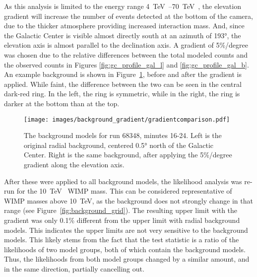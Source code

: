 As this analysis is limited to the energy range \SIrange{4}{70}{\TeV{}}, the elevation gradient will increase the number of events detected at the bottom of the camera, due to the thicker atmosphere providing increased interaction mass.
And, since the Galactic Center is visible almost directly south at an azimuth of \ang{193}, the elevation axis is almost parallel to the declination axis.
A gradient of 5\%/degree was chosen due to the relative differences between the total modeled counts and the observed counts in Figures \ref{fig:gc_profile_gal_l} and \ref{fig:gc_profile_gal_b}.
An example background is shown in Figure~\ref{fig:bkg_flatvsgrad}, before and after the gradient is applied.
While faint, the difference between the two can be seen in the central dark-red ring.
In the left, the ring is symmetric, while in the right, the ring is darker at the bottom than at the top.

\begin{figure}[tb]
  \centering
  \texttt{[image: images/background\_gradient/gradientcomparison.pdf]}
  \caption[Background Gradient Comparison]{
    The background models for run 68348, minutes 16-24.
    Left is the original radial background, centered \ang{0.5} north of the Galactic Center.
    Right is the same background, after applying the 5\%/degree gradient along the elevation axis.
  }
  \label{fig:bkg_flatvsgrad}
\end{figure}

After these were applied to all background models, the likelihood analysis was re-run for the \SI{10}{\TeV{}} WIMP mass.
This can be considered representative of WIMP masses above \SI{10}{\TeV}, as the background does not strongly change in that range (see Figure~\ref{fig:background_grid}).
The resulting upper limit with the gradient was only 0.1\% different from the upper limit with radial background models.
This indicates the upper limits are not very sensitive to the background models.
%
%
This likely stems from the fact that the test statistic is a ratio of the likelihoods of two model groups, both of which contain the background models.
Thus, the likelihoods from both model groups changed by a similar amount, and in the same direction, partially cancelling out.



